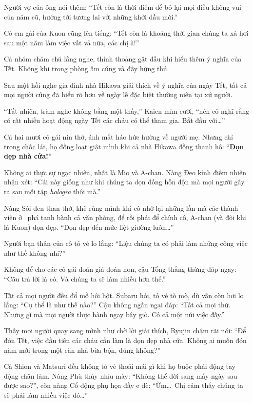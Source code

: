\documentclass[../main.tex]{subfiles}
\begin{document}
Người vợ của ông nói thêm: ``Tết còn là thời điểm để bỏ lại mọi điều không vui của năm cũ, hướng tới tương lai với những khởi đầu mới.''

Cô em gái của Kuon cũng lên tiếng: ``Tết còn là khoảng thời gian chúng ta xả hơi sau một năm làm việc vất vả nữa, các chị à!''

Cả nhóm chăm chú lắng nghe, thỉnh thoảng gật đầu khi hiểu thêm ý nghĩa của Tết. Không khí trong phòng ấm cúng và đầy hứng thú.

\ct

Sau một hồi nghe gia đình nhà Hikawa giải thích về ý nghĩa của ngày Tết, tất cả mọi người cũng đã hiểu rõ hơn về ngày lễ đặc biệt thường niên tại xứ người.

``Tất nhiên, trăm nghe không bằng một thấy,'' Kaien mỉm cười, ``nên cô nghĩ rằng có rất nhiều hoạt động ngày Tết các cháu có thể tham gia. Bắt đầu với\dots''

Cả hai mươi cô gái nín thở, ánh mắt háo hức hướng về người mẹ. Nhưng chỉ trong chốc lát, họ đồng loạt giật mình khi cả nhà Hikawa đồng thanh hô: ``\textbf{Dọn dẹp nhà cửa!}''

Không ai thực sự ngạc nhiên, nhất là Mio và A-chan. Nàng Đeo kính điềm nhiên nhận xét: ``Cái này giống như khi chúng ta dọn đống hỗn độn mà mọi người gây ra sau mỗi tập \textit{hologra} thôi mà.''

Nàng Sói đen than thở, khẽ rùng mình khi cô nhớ lại những lần mà các thành viên ở \hll\ phá tanh bành cả văn phòng, để rồi phải để chính cô, A-chan (và đôi khi là Kuon) dọn dẹp. ``Dọn dẹp đến mức liệt giường luôn\dots''

Người bạn thân của cô tỏ vẻ lo lắng: ``Liệu chúng ta có phải làm những công việc như thế không nhỉ?''

Không để cho các cô gái đoán già đoán non, cậu Tổng thẳng thừng đáp ngay: ``Câu trả lời là có. Và chúng ta sẽ làm nhiều hơn thế.''

Tất cả mọi người đều đổ mồ hôi hột. Subaru hỏi, tỏ vẻ tò mò, dù vẫn còn hơi lo lắng: ``Cụ thể là như thế nào?'' Cậu không ngần ngại đáp: ``Tất cả mọi thứ. Những gì mà mọi người thực hành ngay bây giờ. Có cả một núi việc đấy.''

Thấy mọi người quay sang mình như chờ lời giải thích, Ryujin chậm rãi nói: ``Để đón Tết, việc đầu tiên các cháu cần làm là dọn dẹp nhà cửa. Không ai muốn đón năm mới trong một căn nhà bừa bộn, đúng không?''

Cả Shion và Matsuri đều không tỏ vẻ thoải mái gì khi họ buộc phải động tay động chân làm. Nàng Phù thủy nhíu mày: ``Không thể dời sang mấy ngày sau được sao?'', còn nàng Cổ động phụ họa đầy e dè: ``Ừm\dots\ Chị cảm thấy chúng ta sẽ phải làm nhiều việc đó\dots''
\end{document}
